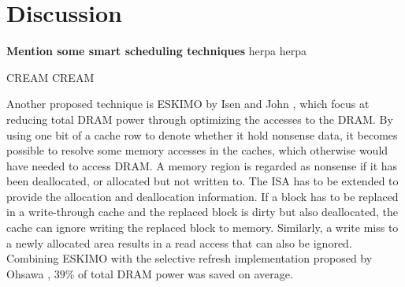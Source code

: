 \section{Discussion} 
\label{sec:disc}


\textbf{Mention some smart scheduling techniques}
herpa herpa

CREAM CREAM \cite{cream}

Another proposed technique is ESKIMO by Isen and John \cite{eskimo}, which focus at reducing total DRAM power through optimizing the accesses to the DRAM. By using one bit of a cache row to denote whether it hold nonsense data, it becomes possible to resolve some memory accesses in the caches, which otherwise would have needed to access DRAM. A memory region is regarded as nonsense if it has been deallocated, or allocated but not written to. The ISA has to be extended to provide the allocation and deallocation information. If a block has to be replaced in a write-through cache and the replaced block is dirty but also deallocated, the cache can ignore writing the replaced block to memory. Similarly, a write miss to a newly allocated area results in a read access that can also be ignored. Combining ESKIMO with the selective refresh implementation proposed by Ohsawa \cite{ohsawa}, $39\%$ of total DRAM power was saved on average.

